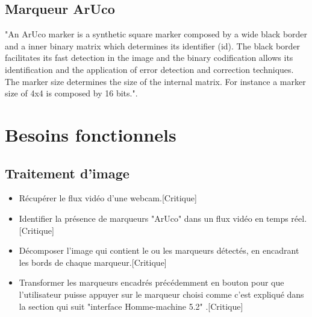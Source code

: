 \documentclass[12pt,a4paper]{article}
\begin{document}
\subsection{Marqueur ArUco}
"An ArUco marker is a synthetic square marker composed by a wide black border and a inner binary matrix which determines its identifier (id). The black border facilitates its fast detection in the image and the binary codification allows its identification and the application of error detection and correction techniques. The marker size determines the size of the internal matrix. For instance a marker size of 4x4 is composed by 16 bits."\cite{ref16}.

\section{Besoins fonctionnels}
\subsection{Traitement d'image}

\begin{itemize}
\item Récupérer le flux vidéo d'une webcam.[Critique]
\item Identifier la présence de marqueurs "ArUco" dans un flux vidéo en temps réel.[Critique]
\item Décomposer l'image qui contient le ou les marqueurs détectés, en encadrant les bords de chaque marqueur.[Critique]
\item Transformer les marqueurs encadrés précédemment en bouton pour que l'utilisateur puisse appuyer sur le marqueur choisi comme c'est expliqué dans la section qui suit "interface Homme-machine 5.2" .[Critique]
\end{itemize}
\end{document}
